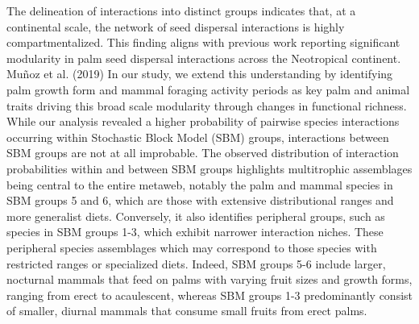 \documentclass[
]{agujournal2019}
\begin{document}
The delineation of interactions into distinct groups indicates that, at
a continental scale, the network of seed dispersal interactions is
highly compartmentalized. This finding aligns with previous work
reporting significant modularity in palm seed dispersal interactions
across the Neotropical continent. Muñoz et al. (2019) In our study, we
extend this understanding by identifying palm growth form and mammal
foraging activity periods as key palm and animal traits driving this
broad scale modularity through changes in functional richness. While our
analysis revealed a higher probability of pairwise species interactions
occurring within Stochastic Block Model (SBM) groups, interactions
between SBM groups are not at all improbable. The observed distribution
of interaction probabilities within and between SBM groups highlights
multitrophic assemblages being central to the entire metaweb, notably
the palm and mammal species in SBM groups 5 and 6, which are those with
extensive distributional ranges and more generalist diets. Conversely,
it also identifies peripheral groups, such as species in SBM groups 1-3,
which exhibit narrower interaction niches. These peripheral species
assemblages which may correspond to those species with restricted ranges
or specialized diets. Indeed, SBM groups 5-6 include larger, nocturnal
mammals that feed on palms with varying fruit sizes and growth forms,
ranging from erect to acaulescent, whereas SBM groups 1-3 predominantly
consist of smaller, diurnal mammals that consume small fruits from erect
palms.
\end{document}

